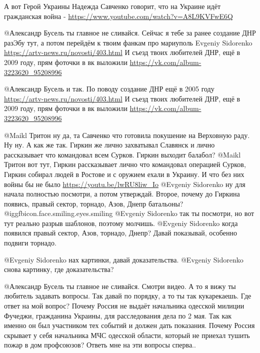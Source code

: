 \begin{multicols}{2}
\begin{itemize}
А вот Герой Украины Надежда Савченко говорит, что на Украине идёт гражданская
война - \url{https://www.youtube.com/watch?v=A8L9KVFwE6Q} 

 @Александр Бусель  ты главное не сливайся. Сейчас я тебе за ранее создание ДНР разЭбу тут, а потом перейдём к твоим фанкам про мариуполь
Evgeniy Sidorenko
\url{https://artv-news.ru/novosti/403.html}
И съезд твоих любителей ДНР, ещё в 2009 году, прям фоточки в вк выложили
\url{https://vk.com/album-3223620_95208996}

 @Александр Бусель   и так. По поводу создание ДНР ещё в 2005 году
\url{https://artv-news.ru/novosti/403.html}
И съезд твоих любителей ДНР, ещё в 2009 году, прям фоточки в вк выложили
\url{https://vk.com/album-3223620_95208996}

 @Maikl Тритон  ну да, та Савченко что готовила покушение на Верховную раду. Ну ну. А как же так. Гиркин же лично захватывал Славянск и лично рассказывает что командовал всем Сурков. Гиркин выходит балабол?
 @Maikl Тритон  вот тут, Гиркин рассказывает лично что командовал операцией Сурков, Гиркин собирал людей в Ростове и с оружием ехали в Украину. И что без них войны бы не было
\url{https://youtu.be/lwRU8liw_Io}
 @Evgeniy Sidorenko  ну для начала полностью посмотри, а потом утверждай. Второе, почему до Гиркина появись, правый сектор, торнадо, Азов, Днепр батальоны?  @igg{fbicon.face.smiling.eyes.smiling} 
 @Evgeniy Sidorenko  так ты посмотри, но вот тут реально разрыв шаблонов, поэтому молчишь.
 @Evgeniy Sidorenko  когда появился правый сектор, Азов, торнадо, Днепр? Давай показывай, особенно подвиги торнадо. 

 @Evgeniy Sidorenko  нах картинки, давай доказательства.
 @Evgeniy Sidorenko  снова картинку, где доказательства?

@Александр Бусель  ты главное не сливайся. Смотри видео. А то я вижу ты
любитель задавать вопросы. Так давай по порядку, а то ты так кукарекаешь. Где
ответ на мой вопрос? Почему Россия не выдаёт начальника одесской милиции
Фучеджи, гражданина Украины, для расследования дела по 2 мая. Так как именно
он был участником тех событий и должен дать показания. Почему Россия скрывает
у себя начальника МЧС одесской области, который не приехал тушить пожар в дом
профсоюзов? Ответь мне на эти вопросы сперва.. 


\end{itemize}
\end{multicols}
